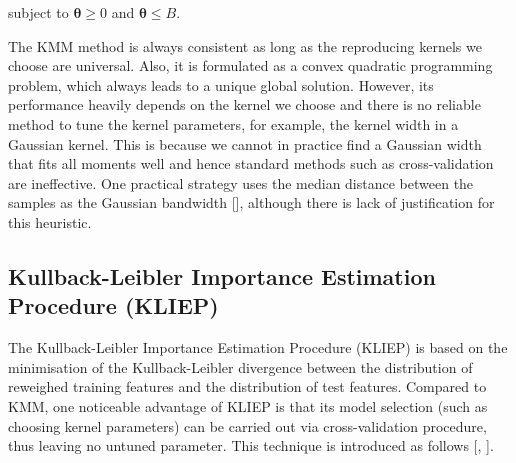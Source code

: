 \documentclass[a4paper,12pt]{article}
\begin{document}
subject to $\boldsymbol{\theta} \geq 0 $ and $\boldsymbol{\theta} \leq B$.

The KMM method is always consistent as long as the reproducing kernels we choose are universal. Also, it is formulated as a convex quadratic programming problem, which always leads to a unique global solution. However, its performance heavily depends on the kernel we choose and there is no reliable method to tune the kernel parameters, for example, the kernel width in a Gaussian kernel. This is because we cannot in practice find a Gaussian width that fits all moments well and hence standard methods such as cross-validation are ineffective. One practical strategy uses the median distance between the samples as the Gaussian bandwidth [\cite{smola1998learning}], although there is lack of justification for this heuristic. 

%
%
%
%
%
%
\subsection{Kullback-Leibler Importance Estimation Procedure (KLIEP)}
The Kullback-Leibler Importance Estimation Procedure (KLIEP) is based on the minimisation of the Kullback-Leibler divergence between the distribution of reweighed training features and the distribution of test features. Compared to KMM, one noticeable advantage of KLIEP is that its model selection (such as choosing kernel parameters) can be carried out via cross-validation procedure, thus leaving no untuned parameter. This technique is introduced as follows [\cite{tsuboi2009direct}, \cite{sugiyama2010density}].
\end{document}
